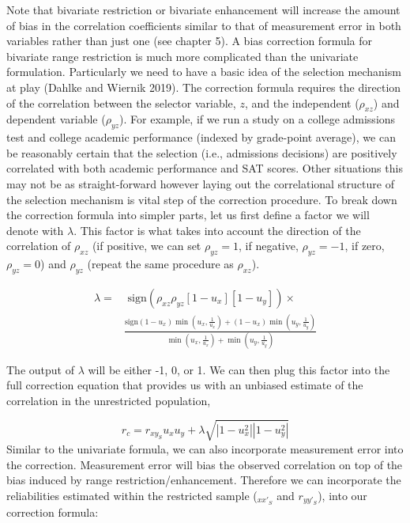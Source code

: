 \documentclass[
  letterpaper,
  DIV=11,
  numbers=noendperiod]{scrreprt}
\begin{document}
Note that bivariate restriction or bivariate enhancement will increase
the amount of bias in the correlation coefficients similar to that of
measurement error in both variables rather than just one (see chapter
5). A bias correction formula for bivariate range restriction is much
more complicated than the univariate formulation. Particularly we need
to have a basic idea of the selection mechanism at play (Dahlke and
Wiernik 2019). The correction formula requires the direction of the
correlation between the selector variable, \(z\), and the independent
(\(\rho_{xz}\)) and dependent variable (\(\rho_{yz}\)). For example, if
we run a study on a college admissions test and college academic
performance (indexed by grade-point average), we can be reasonably
certain that the selection (i.e., admissions decisions) are positively
correlated with both academic performance and SAT scores. Other
situations this may not be as straight-forward however laying out the
correlational structure of the selection mechanism is vital step of the
correction procedure. To break down the correction formula into simpler
parts, let us first define a factor we will denote with \(\lambda\).
This factor is what takes into account the direction of the correlation
of \(\rho_{xz}\) (if positive, we can set \(\rho_{yz}=1\), if negative,
\(\rho_{yz}=-1\), if zero, \(\rho_{yz}=0\)) and \(\rho_{yz}\) (repeat
the same procedure as \(\rho_{xz}\)).

\begin{align}
\lambda =& \text{ sign}\left(\rho_{xz}\rho_{yz} [1-u_x][1-u_y]\right)\times \\
&\frac{\text{sign}
\left(1-u_x\right)\min\left(u_x,\frac{1}{u_x}\right) + 
\left(1-u_x\right)\min\left(u_y,\frac{1}{u_y}\right)
}{
\min\left(u_x,\frac{1}{u_x}\right)+\min\left(u_y,\frac{1}{u_y}\right)
}
\end{align}

The output of \(\lambda\) will be either -1, 0, or 1. We can then plug
this factor into the full correction equation that provides us with an
unbiased estimate of the correlation in the unrestricted population,

\[
r_c = r_{xy_S}u_xu_y+\lambda\sqrt{|1-u_x^2||1-u_y^2|}
\] Similar to the univariate formula, we can also incorporate
measurement error into the correction. Measurement error will bias the
observed correlation on top of the bias induced by range
restriction/enhancement. Therefore we can incorporate the reliabilities
estimated within the restricted sample (\(_{xx'_S}\) and \(r_{yy'_S}\)),
into our correction formula:
\end{document}
